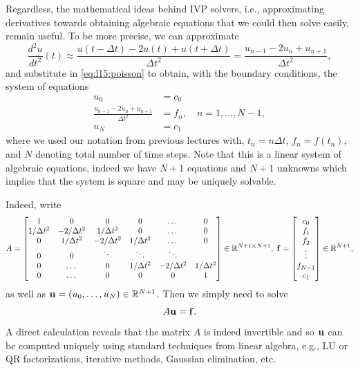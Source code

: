 Regardless, the mathematical ideas behind IVP solvers, 
i.e., approximating derivatives towards obtaining algebraic 
equations that we could then solve easily, remain useful. 
To be more precise, we can approximate 
\begin{equation*}
    \frac{d^2 u}{dt^2}(t) \approx 
    \frac{u(t - \Delta t) - 2 u(t) + u(t + \Delta t)}{\Delta t ^2}
    = \frac{u_{n-1} - 2 u_n + u_{n+1}}{\Delta t^2},
\end{equation*}
and substitute in \eqref{eq:l15:poisson} to obtain, with 
the boundary conditions, the system of equations 
\begin{equation}\label{eq:l15:Poisson-Fd}
   \begin{aligned}
        u_0 & = c_0 \\
        \frac{u_{n-1} - 2 u_n + u_{n+1}}{\Delta t^2} &= 
        f_n, \quad n=1, \dots, N-1, \\ 
        u_{N} &= c_1
   \end{aligned}
\end{equation}
where we used our notation from previous lectures with, 
$t_n = n \Delta t$,  
$f_n = f(t_n)$, and $N$ denoting total number of 
time steps. Note that this is a linear system of algebraic equations,
indeed we have $N+1$ equations and $N+1$ unknowns which implies 
that the system is square and may be uniquely solvable. 

Indeed, write 
\begin{equation*}
    A = \begin{bmatrix}
    1 & 0 & 0 & 0 & \dots & 0 \\ 
    1/\Delta t^2 & -2/\Delta t^2 & 1/\Delta t^2 & 0 &\dots & 0 \\
    0 & 1/\Delta t^2 & -2/\Delta t^2 & 1/\Delta t^2 & \dots & 0 \\ 
    0 & 0 & \ddots & \ddots & \ddots & \\     
    0 & \dots  & 0 &1/\Delta t^2  &-2/\Delta t^2 & 1/\Delta t^2 \\
    0 & \dots &  0 & 0 & 0 & 1
    \end{bmatrix} \in \mathbb{R}^{N+1 \times N+1}, 
    \;
    \mathbf{f} = \begin{bmatrix}
        c_0 \\ 
        f_1 \\
        f_2 \\ 
        \vdots \\
        f_{N-1} \\ 
        c_1
    \end{bmatrix} \in \mathbb{R}^{N+1},
\end{equation*}
as well as $\mathbf{u} = (u_0, \dots, u_N) \in \mathbb{R}^{N+1}$. Then we 
simply need to solve 
\begin{equation*}
    A \mathbf{u} = \mathbf{f}.
\end{equation*}
A direct calculation reveals that the matrix $A$ is indeed 
invertible and so $\mathbf{u}$ can be computed uniquely using 
standard techniques from linear algebra, e.g., 
LU or QR factorizations, iterative methods, Gaussian elimination, etc.

